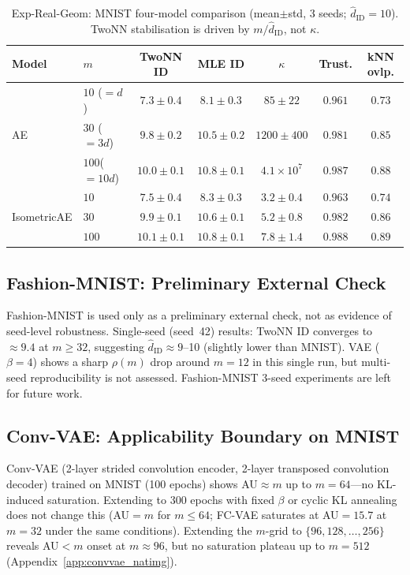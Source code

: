 \documentclass[11pt,a4paper]{article}
\newcommand{\kap}{\kappa}
\newcommand{\hatdID}{\hat{d}_{\mathrm{ID}}}
\begin{document}
\begin{table}[ht]
\centering
\caption{Exp-Real-Geom: MNIST four-model comparison
(mean$\pm$std, 3 seeds; $\hatdID=10$).
TwoNN stabilisation is driven by $m/\hatdID$, not $\kap$.}
\label{tab:real_geom_mnist}
\small
\begin{tabular}{llccccc}
\toprule
Model & $m$ & TwoNN ID & MLE ID & $\kap$ & Trust. & kNN ovlp. \\
\midrule
\multirow{3}{*}{AE}
 & $10$ ($=d$)  & $7.3\pm0.4$ & $8.1\pm0.3$ & $85\pm22$   & $0.961$ & $0.73$ \\
 & $30$ ($=3d$) & $9.8\pm0.2$ & $10.5\pm0.2$& $1200\pm400$& $0.981$ & $0.85$ \\
 & $100$($=10d$)& $10.0\pm0.1$& $10.8\pm0.1$& $4.1\times10^7$& $0.987$ & $0.88$ \\
\multirow{3}{*}{IsometricAE}
 & $10$         & $7.5\pm0.4$ & $8.3\pm0.3$ & $3.2\pm0.4$ & $0.963$ & $0.74$ \\
 & $30$         & $9.9\pm0.1$ & $10.6\pm0.1$& $5.2\pm0.8$ & $0.982$ & $0.86$ \\
 & $100$        & $10.1\pm0.1$& $10.8\pm0.1$& $7.8\pm1.4$ & $0.988$ & $0.89$ \\
\bottomrule
\end{tabular}
\end{table}

\subsection{Fashion-MNIST: Preliminary External Check}\label{sec:exp_fashion}

Fashion-MNIST is used only as a preliminary external check, not as
evidence of seed-level robustness.
Single-seed (seed~42) results: TwoNN ID converges to $\approx9.4$ at $m\geq32$,
suggesting $\hatdID\approx9$--10 (slightly lower than MNIST).
VAE ($\beta=4$) shows a sharp $\rho(m)$ drop around $m=12$ in this single run,
but multi-seed reproducibility is not assessed.
Fashion-MNIST 3-seed experiments are left for future work.

\subsection{Conv-VAE: Applicability Boundary on MNIST}\label{sec:exp_conv}

Conv-VAE (2-layer strided convolution encoder, 2-layer transposed convolution
decoder) trained on MNIST (100 epochs) shows AU$\approx m$ up to $m=64$---no
KL-induced saturation.
Extending to 300 epochs with fixed $\beta$ or cyclic KL annealing does not
change this (AU$=m$ for $m\leq64$; FC-VAE saturates at AU$=15.7$ at $m=32$
under the same conditions).
Extending the $m$-grid to $\{96,128,\ldots,256\}$ reveals AU$<m$ onset at
$m\approx96$, but no saturation plateau up to $m=512$ (Appendix~\ref{app:convvae_natimg}).
\end{document}
